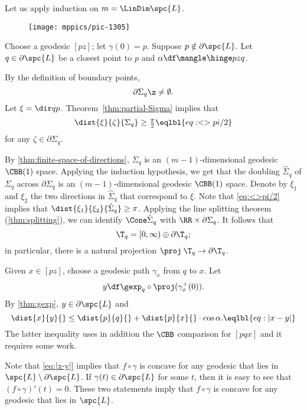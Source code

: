 

Let us apply induction on $m=\LinDim \spc{L}$.

\begin{wrapfigure}{r}{30mm}
\vskip-2mm
\centering
\texttt{[image: mppics/pic-1305]}
\end{wrapfigure}

Choose a geodesic $[pz]$; let $\gamma(0)=p$.
Suppose $p\notin\partial \spc{L}$.
Let $q\in \partial\spc{L}$ be a closest point to $p$ and $\alpha\df\mangle\hinge pzq$.

By the definition of boundary points, 
\[\partial \Sigma_q\z\ne\emptyset.\]
Let $\xi=\dir qp$.
Theorem~\ref{thm:partial-Sigma} implies that 
\[\dist{\xi}{\zeta}{\Sigma_q}\ge \tfrac\pi2
\eqlbl{eq:<>pi/2}\]
for any $\zeta\in\partial\Sigma_q$.

By \ref{thm:finite-space-of-directions}, $\Sigma_q$ is an $(m-1)$-dimensional geodesic $\CBB(1)$ space.
Applying the induction hypothesis, we get that the doubling $\hat\Sigma_q$ of $\Sigma_q$ across $\partial \Sigma_q$ is an $(m-1)$-dimensional geodesic $\CBB(1)$ space.
Denote by $\xi_1$ and $\xi_2$ the two directions in $\hat\Sigma_q$ that correspond to $\xi$.
Note that \ref{eq:<>pi/2} implies that $\dist{\xi_1}{\xi_2}{\hat\Sigma_q}\ge \pi$.
Applying the line splitting theorem (\ref{thm:splitting}), we can identify 
$\Cone\hat\Sigma_q$ with $\RR\times \partial\Sigma_q$.
It follows that 
\[\T_q=[0,\infty)\oplus \partial\T_q;\]
in particular, there is a natural projection $\proj\:\T_q\to \partial\T_q$.

Given $x\in [pz]$, choose a geodesic path $\gamma_x$ from $q$ to $x$.
Let 
\[y
\df
\gexp_q\circ\proj(\gamma^+_x(0)).\]
By \ref{thm:gexp}, $y\in \partial\spc{L}$ and 
\[\dist{x}{y}{}\le \dist{p}{q}{}+\dist{p}{x}{}\cdot \cos\alpha.\eqlbl{eq:|x-y|}\]
The latter inequality uses in addition the $\CBB$ comparison for $[pqx]$ and it requires some work.

Note that \ref{eq:|x-y|} implies that $f\circ\gamma$ is concave for any geodesic that lies in $\spc{L}\setminus \partial \spc{L}$.
If $\gamma(t)\in \partial \spc{L}$ for some $t$, then it is easy to see that $(f\circ\gamma)'(t)=0$.
These two statements imply that $f\circ\gamma$ is concave for any geodesic that lies in $\spc{L}$.
















